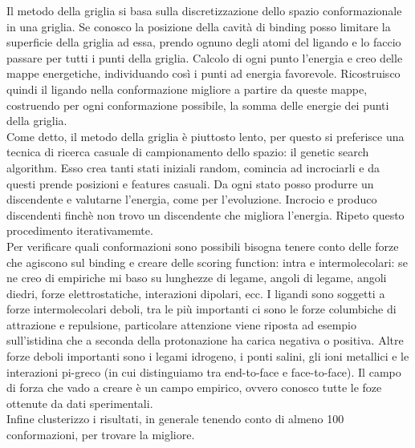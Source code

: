 \documentclass{article}
\begin{document}
Il metodo della griglia si basa sulla discretizzazione dello spazio conformazionale in una griglia. Se conosco la posizione della cavità di binding posso limitare la superficie della griglia ad essa, prendo ognuno degli atomi del ligando e lo faccio passare per tutti i punti della griglia.
Calcolo di ogni punto l'energia e creo delle mappe energetiche, individuando così i punti ad energia favorevole. Ricostruisco quindi il ligando nella conformazione migliore a partire da queste mappe, costruendo per ogni conformazione possibile, la somma delle energie dei punti della griglia.\\
Come detto, il metodo della griglia è piuttosto lento, per questo si preferisce una tecnica di ricerca casuale di campionamento dello spazio: il genetic search algorithm. Esso crea tanti stati iniziali random, comincia ad incrociarli e da questi prende posizioni e features casuali. Da ogni stato posso produrre un discendente e valutarne l'energia, come per l'evoluzione. Incrocio e produco discendenti finchè non trovo un discendente che migliora l'energia. Ripeto questo procedimento iterativamemte.\\
Per verificare quali conformazioni sono possibili bisogna tenere conto delle forze che agiscono sul binding e creare delle scoring function: intra e intermolecolari: se ne creo di empiriche mi baso su lunghezze di legame, angoli di legame, angoli diedri, forze elettrostatiche, interazioni dipolari, ecc. I ligandi sono soggetti a forze intermolecolari deboli, tra le più importanti ci sono le forze columbiche di attrazione e repulsione, particolare attenzione viene riposta ad esempio sull'istidina che a seconda della protonazione ha carica negativa o positiva.
Altre forze deboli importanti sono i legami idrogeno, i ponti salini, gli ioni metallici e le interazioni pi-greco (in cui distinguiamo tra end-to-face e face-to-face). Il campo di forza che vado a creare è un campo empirico, ovvero conosco tutte le foze ottenute da dati sperimentali.\\
Infine clusterizzo i risultati, in generale tenendo conto di almeno 100 conformazioni, per trovare la migliore.
\end{document}

